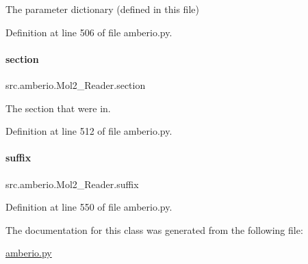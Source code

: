 The parameter dictionary (defined in this file) 



Definition at line 506 of file amberio.\+py.

\mbox{\label{classsrc_1_1amberio_1_1Mol2__Reader_ad998286e913c58648a6b0517adab70c7}} 
\paragraph{\texorpdfstring{section}{section}}
{\footnotesize\ttfamily src.\+amberio.\+Mol2\+\_\+\+Reader.\+section}



The section that we\textquotesingle{}re in. 



Definition at line 512 of file amberio.\+py.

\mbox{\label{classsrc_1_1amberio_1_1Mol2__Reader_af3c71592f1021771b3529bf76ca19a98}} 
\paragraph{\texorpdfstring{suffix}{suffix}}
{\footnotesize\ttfamily src.\+amberio.\+Mol2\+\_\+\+Reader.\+suffix}



Definition at line 550 of file amberio.\+py.



The documentation for this class was generated from the following file\+:\begin{DoxyCompactItemize}
\item 
\hyperlink{amberio_8py}{amberio.\+py}\end{DoxyCompactItemize}
